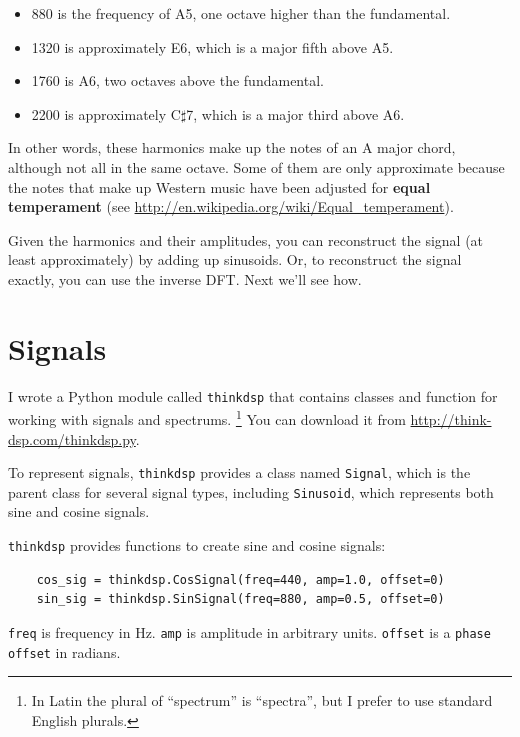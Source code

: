 \documentclass[12pt]{book}
\begin{document}
\begin{itemize}

\item 880 is the frequency of
A5, one octave higher than the fundamental.  

\item 1320 is approximately E6, which is a major fifth above A5.

\item 1760 is A6, two octaves above the fundamental. 

\item 2200 is approximately C$\sharp$7, which is a major third
above A6.

\end{itemize}

In other words, these harmonics make up the notes of an A major
chord, although not all in the same octave.  Some of them are only
approximate because the notes that make up Western music have been
adjusted for {\bf equal temperament} (see
 \url{http://en.wikipedia.org/wiki/Equal_temperament}).

Given the harmonics and their amplitudes, you can reconstruct the
signal (at least approximately) by adding up sinusoids.  Or, to
reconstruct the signal exactly, you can use the inverse DFT.  
Next we'll see how.


\section{Signals}

I wrote a Python module called {\tt thinkdsp} that contains
classes and function for working with signals and spectrums.
\footnote{In Latin the plural of ``spectrum'' is ``spectra'', but I
prefer to use standard English plurals.}  You can download
it from \url{http://think-dsp.com/thinkdsp.py}.

To represent signals, {\tt thinkdsp} provides a class named
{\tt Signal}, which is the parent class for several signal types,
including {\tt Sinusoid}, which represents both sine and cosine
signals.

{\tt thinkdsp} provides functions to create sine and cosine signals:

\begin{verbatim}
    cos_sig = thinkdsp.CosSignal(freq=440, amp=1.0, offset=0)
    sin_sig = thinkdsp.SinSignal(freq=880, amp=0.5, offset=0)
\end{verbatim}

{\tt freq} is frequency in Hz.  {\tt amp} is amplitude in arbitrary
units.  {\tt offset} is a {\tt phase offset} in radians.
\end{document}
